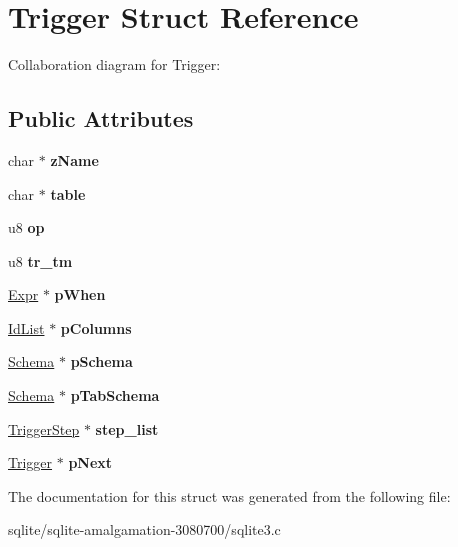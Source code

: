 \hypertarget{struct_trigger}{\section{Trigger Struct Reference}
\label{struct_trigger}
}


Collaboration diagram for Trigger\+:
\subsection*{Public Attributes}
\begin{DoxyCompactItemize}
\item 
\hypertarget{struct_trigger_a9aecea5dadd7ae93b7f585c4b914791c}{char $\ast$ {\bfseries z\+Name}}\label{struct_trigger_a9aecea5dadd7ae93b7f585c4b914791c}

\item 
\hypertarget{struct_trigger_ab9d5500f7fc43382e867733a2968ecae}{char $\ast$ {\bfseries table}}\label{struct_trigger_ab9d5500f7fc43382e867733a2968ecae}

\item 
\hypertarget{struct_trigger_a855d6b6a302d8d80e1d30ddd70fd403e}{u8 {\bfseries op}}\label{struct_trigger_a855d6b6a302d8d80e1d30ddd70fd403e}

\item 
\hypertarget{struct_trigger_af0d10da140b068bfd76aaeb6607fa6cf}{u8 {\bfseries tr\+\_\+tm}}\label{struct_trigger_af0d10da140b068bfd76aaeb6607fa6cf}

\item 
\hypertarget{struct_trigger_a1b6cdd46e8b98562920d1acee86281ed}{\hyperlink{struct_expr}{Expr} $\ast$ {\bfseries p\+When}}\label{struct_trigger_a1b6cdd46e8b98562920d1acee86281ed}

\item 
\hypertarget{struct_trigger_a8505fbdf63ca9eadf4b2585e99faa4e4}{\hyperlink{struct_id_list}{Id\+List} $\ast$ {\bfseries p\+Columns}}\label{struct_trigger_a8505fbdf63ca9eadf4b2585e99faa4e4}

\item 
\hypertarget{struct_trigger_a83edbfa91ce6520a6ebc1a21acc2cd5e}{\hyperlink{struct_schema}{Schema} $\ast$ {\bfseries p\+Schema}}\label{struct_trigger_a83edbfa91ce6520a6ebc1a21acc2cd5e}

\item 
\hypertarget{struct_trigger_a8e4a9b3f4bcc5c645e1777b3bb94a6d8}{\hyperlink{struct_schema}{Schema} $\ast$ {\bfseries p\+Tab\+Schema}}\label{struct_trigger_a8e4a9b3f4bcc5c645e1777b3bb94a6d8}

\item 
\hypertarget{struct_trigger_a4206faaae6cdf1a2b22a2c9f15c88642}{\hyperlink{struct_trigger_step}{Trigger\+Step} $\ast$ {\bfseries step\+\_\+list}}\label{struct_trigger_a4206faaae6cdf1a2b22a2c9f15c88642}

\item 
\hypertarget{struct_trigger_ac28107e1c45789e0146fe45867b8dfdb}{\hyperlink{struct_trigger}{Trigger} $\ast$ {\bfseries p\+Next}}\label{struct_trigger_ac28107e1c45789e0146fe45867b8dfdb}

\end{DoxyCompactItemize}


The documentation for this struct was generated from the following file\+:\begin{DoxyCompactItemize}
\item 
sqlite/sqlite-\/amalgamation-\/3080700/sqlite3.\+c\end{DoxyCompactItemize}
